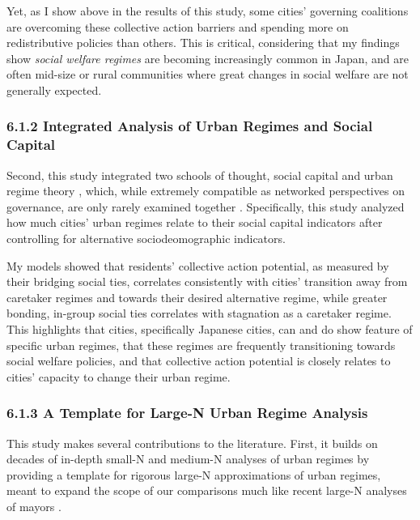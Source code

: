\documentclass[preprint, 3p,
authoryear]{elsarticle} %
\begin{document}
Yet, as I show above in the results of this study, some cities'
governing coalitions are overcoming these collective action barriers and
spending more on redistributive policies than others. This is critical,
considering that my findings show \emph{social welfare regimes} are
becoming increasingly common in Japan, and are often mid-size or rural
communities where great changes in social welfare are not generally
expected.

\hypertarget{integrated-analysis-of-urban-regimes-and-social-capital}{%
\subsubsection{6.1.2 Integrated Analysis of Urban Regimes and Social
Capital}\label{integrated-analysis-of-urban-regimes-and-social-capital}}

Second, this study integrated two schools of thought, social capital
\citep{putnam_2000, woolcock_2010, aldrich_2012, alcorta_et_al_2020, fraser_2021_IJDRR}
and urban regime theory \citep{stone_1993, stoker_and_mossberger_1994},
which, while extremely compatible as networked perspectives on
governance, are only rarely examined together \citep{fraser_et_al_2020}.
Specifically, this study analyzed how much cities' urban regimes relate
to their social capital indicators after controlling for alternative
sociodeomographic indicators.

My models showed that residents' collective action potential, as
measured by their bridging social ties, correlates consistently with
cities' transition away from caretaker regimes and towards their desired
alternative regime, while greater bonding, in-group social ties
correlates with stagnation as a caretaker regime. This highlights that
cities, specifically Japanese cities, can and do show feature of
specific urban regimes, that these regimes are frequently transitioning
towards social welfare policies, and that collective action potential is
closely relates to cities' capacity to change their urban regime.

\hypertarget{a-template-for-large-n-urban-regime-analysis}{%
\subsubsection{6.1.3 A Template for Large-N Urban Regime
Analysis}\label{a-template-for-large-n-urban-regime-analysis}}

This study makes several contributions to the literature. First, it
builds on decades of in-depth small-N
\citep{munoz_and_henry_1986, stone_1989, whelan_et_al_1994, yeum_2002, gendron_and_domhoff_2018}
and medium-N analyses of urban regimes
\citep{kilburn_2004, thompson_2005, de_socio_2007} by providing a
template for rigorous large-N approximations of urban regimes, meant to
expand the scope of our comparisons much like recent large-N analyses of
mayors
\citep{ramirez_perez_et_al_2008, debenedictis_kessner_and_warshaw_2016, einstein_and_glick_2018, murphy_2019}.
\end{document}

